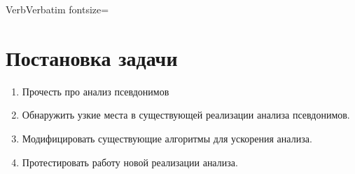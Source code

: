 

\usepackage {amsmath}      %
\usepackage {amssymb}
\usepackage {textcase}     %
\usepackage {indentfirst}  %

\usepackage {fancyvrb}     %
\DefineVerbatimEnvironment%
    {Verb}{Verbatim}
    {fontsize=\small}

\usepackage {graphicx}





\clearpage
\thispagestyle{empty}

\section*{Постановка задачи}

\begin{enumerate}
  \item Прочесть про анализ псевдонимов
  \item Обнаружить узкие места в существующей реализации анализа псевдонимов.
  \item Модифицировать существующие алгоритмы для ускорения анализа.
  \item Протестировать работу новой реализации анализа.
\end{enumerate}

\clearpage
{}%

